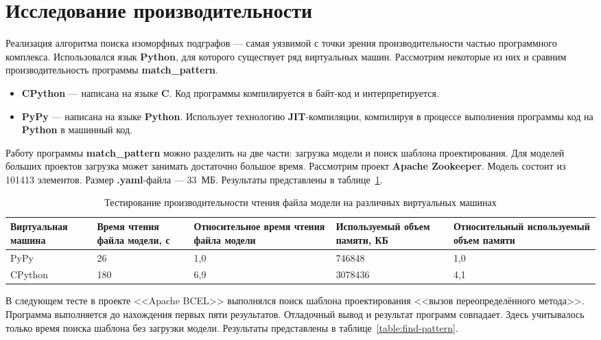 \section{Исследование производительности}

Реализация алгоритма поиска изоморфных подграфов --- самая уязвимой с точки
зрения производительности частью программного комплекса.
Использовался язык \textbf{Python}, для которого существует ряд виртуальных
машин.
Рассмотрим некоторые из них и сравним производительность программы
\textbf{match\_pattern}.

\begin{itemize}
\item \textbf{CPython} --- написана на языке \textbf{C}.
Код программы компилируется в байт-код и интерпретируется.
\item \textbf{PyPy} --- написана на языке \textbf{Python}.
Использует технологию \textbf{JIT}-компиляции, компилируя в процессе выполнения
программы код на \textbf{Python} в машинный код.
\end{itemize}

Работу программы \textbf{match\_pattern} можно разделить на две части:
загрузка модели и поиск шаблона проектирования.
Для моделей больших проектов загрузка может занимать достаточно большое время.
Рассмотрим проект \textbf{Apache Zookeeper}. Модель состоит из 101413 элементов.
Размер \textbf{.yaml}-файла --- 33~МБ.
Результаты представлены в таблице~\ref{table:read-model}.

\begin{table}[ht!]
    \centering
    \begin{tabularx}{\textwidth}{|X|X|X|X|X|}
        \hline
        Виртуальная машина & Время чтения файла модели, с & Относительное время чтения файла модели & Используемый объем памяти, КБ & Относительный используемый объем памяти \\
        \hline
        PyPy & 26 & 1,0 & 746848 & 1,0 \\
        \hline
        CPython & 180 & 6,9 & 3078436 & 4,1 \\
        \hline
    \end{tabularx}
    \caption{Тестирование производительности чтения файла модели на различных виртуальных машинах}
    \label{table:read-model}
\end{table}

В следующем тесте в проекте <<Apache BCEL>> выполнялся поиск шаблона
проектирования <<вызов переопределённого метода>>.
Программа выполняется до нахождения первых пяти результатов.
Отладочный вывод и результат программ совпадает.
Здесь учитывалось только время поиска шаблона без загрузки модели.
Результаты представлены в таблице~\ref{table:find-pattern}.

